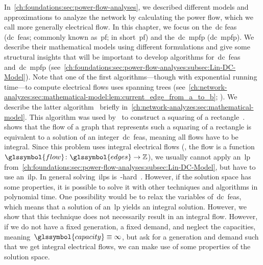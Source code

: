 In~\cref{ch:foundations:sec:power-flow-analyses}, we described different models
and approximations to analyze the network by calculating the power flow, which
we call more generally electrical flow. In this chapter, we focus on
the~\acrlong{dc} \acrlong{feas} (\gls{dc}~\gls{feas}; commonly known
as~\acrlong{pf}; in short~\gls{pf}) and the~\gls{dc}~\acrlong{mpfp}
(\gls{dc}~\gls{mpfp}). We describe their mathematical models using different
formulations and give some structural insights that will be important to develop
algorithms for~\gls{dc}~\gls{feas} and~\gls{dc}~\gls{mpfp}
(see~\cref{ch:foundations:sec:power-flow-analyses:subsec:Lin-DC-Model}). Note
that one of the first algorithms---though with exponential running time---to
compute electrical flows uses spanning trees
(see~\cref{ch:network-analyzes:sec:mathematical-model:lem:current_edge_from_a_to_b};
\parencite{Ses61,Sha87}). We describe the latter
algorithm~\parencite{Ses61,Sha87} briefly
in~\cref{ch:network-analyzes:sec:mathematical-model}. This algorithm was used
by~\textcite{Fel13} to construct a squaring of a
rectangle~\parencite[pp.17ff.]{Fel13}. \citeauthor{Fel13} shows that the flow of
a graph that represents such a squaring of a rectangle is equivalent to a
solution of an integer~\gls{dc}~\gls{feas}, meaning all flows have to be
integral. Since this problem uses integral electrical flows (\ie, the flow is a
function~$
    \glssymbol{flow}
    \colon
    \glssymbol{edges}
    \to
    \integers
$), we usually cannot apply an~\gls{lp}
from~\cref{ch:foundations:sec:power-flow-analyses:subsec:Lin-DC-Model}, but have
to use an~\gls{ilp}. In general solving~\gls{ilp}s is~\NP-hard~\parencite[p.245;
MP1]{Gar79}. However, if the solution space has some properties, it is possible
to solve it with other techniques and algorithms in polynomial time. One
possibility would be to relax the variables of~\gls{dc}~\gls{feas}, which means
that a solution of an~\gls{lp} yields an integral solution. However, we show
that this technique does not necessarily result in an integral flow. However, if
we do not have a fixed generation, a fixed demand, and neglect the capacities,
meaning~$\glssymbol{capacity}\equiv\infty$, but ask for a generation and demand
such that we get integral electrical flows, we can make use of some properties
of the solution space. 
% 

